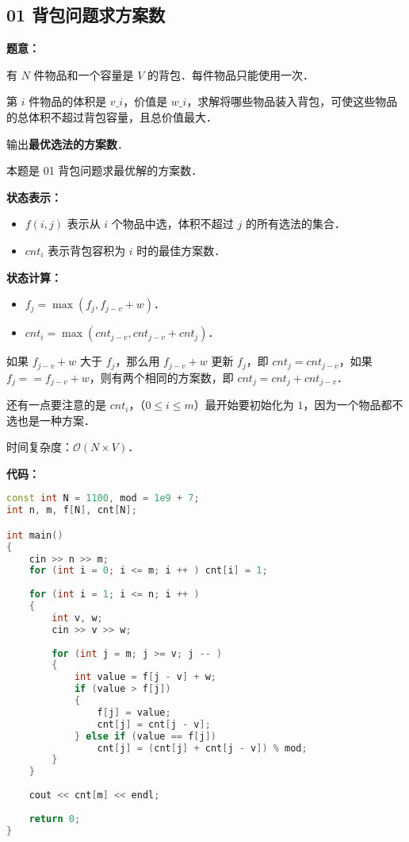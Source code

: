 \subsection{01 背包问题求方案数}

\textbf{题意：}

有 $N$ 件物品和一个容量是 $V$ 的背包．每件物品只能使用一次．

第 $i$ 件物品的体积是 $v\_i$，价值是 $w\_i$，求解将哪些物品装入背包，可使这些物品的总体积不超过背包容量，且总价值最大．

输出\textbf{最优选法的方案数}．

本题是 01 背包问题求最优解的方案数．

\textbf{状态表示：}

\begin{itemize}
\item $f(i, j)$ 表示从 $i$ 个物品中选，体积不超过 $j$ 的所有选法的集合．
\item $cnt_i$ 表示背包容积为 $i$ 时的最佳方案数．
\end{itemize}

\textbf{状态计算：}

\begin{itemize}
\item $f_j = \max(f_j, f_{j - v} + w)$．
\item $cnt_i = \max(cnt_{j - v}, cnt_{j - v} + cnt_j)$．
\end{itemize}

如果 $f_{j - v} + w$ 大于 $f_j$，那么用 $f_{j - v} + w$ 更新 $f_j$，即 $cnt_j = cnt_{j - v}$，如果 $f_j == f_{j - v} + w$，则有两个相同的方案数，即 $cnt_j = cnt_j + cnt_{j - v}$．

还有一点要注意的是 $cnt_i$，（$0 \leq i \leq m$）最开始要初始化为 $1$，因为一个物品都不选也是一种方案．

时间复杂度：$\mathcal{O}(N \times V)$．

\textbf{代码：}

\begin{lstlisting}[language=cpp]
const int N = 1100, mod = 1e9 + 7;
int n, m, f[N], cnt[N];

int main()
{
    cin >> n >> m;
    for (int i = 0; i <= m; i ++ ) cnt[i] = 1;
    
    for (int i = 1; i <= n; i ++ )
    {
        int v, w;
        cin >> v >> w;
        
        for (int j = m; j >= v; j -- )
        {
            int value = f[j - v] + w;
            if (value > f[j])
            {
                f[j] = value;
                cnt[j] = cnt[j - v];
            } else if (value == f[j]) 
                cnt[j] = (cnt[j] + cnt[j - v]) % mod;
        }
    }
    
    cout << cnt[m] << endl;
    
    return 0;
}
\end{lstlisting}

